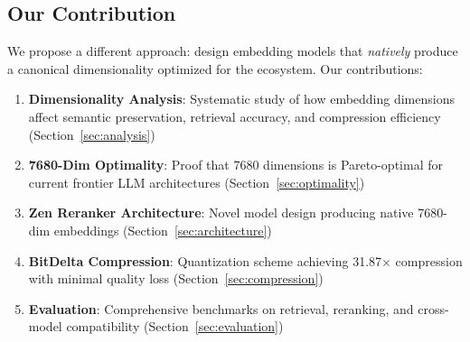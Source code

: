 \subsection{Our Contribution}

We propose a different approach: design embedding models that \emph{natively} produce a canonical dimensionality optimized for the ecosystem. Our contributions:

\begin{enumerate}
    \item \textbf{Dimensionality Analysis}: Systematic study of how embedding dimensions affect semantic preservation, retrieval accuracy, and compression efficiency (Section~\ref{sec:analysis})

    \item \textbf{7680-Dim Optimality}: Proof that 7680 dimensions is Pareto-optimal for current frontier LLM architectures (Section~\ref{sec:optimality})

    \item \textbf{Zen Reranker Architecture}: Novel model design producing native 7680-dim embeddings (Section~\ref{sec:architecture})

    \item \textbf{BitDelta Compression}: Quantization scheme achieving 31.87$\times$ compression with minimal quality loss (Section~\ref{sec:compression})

    \item \textbf{Evaluation}: Comprehensive benchmarks on retrieval, reranking, and cross-model compatibility (Section~\ref{sec:evaluation})
\end{enumerate}

